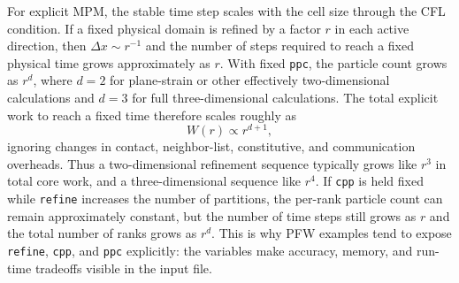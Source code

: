 For explicit MPM, the stable time step scales with the cell size through the CFL condition.  If a fixed physical domain is refined by a factor \(r\) in each active direction, then \(\Delta x\sim r^{-1}\) and the number of steps required to reach a fixed physical time grows approximately as \(r\).  With fixed \texttt{ppc}, the particle count grows as \(r^d\), where \(d=2\) for plane-strain or other effectively two-dimensional calculations and \(d=3\) for full three-dimensional calculations.  The total explicit work to reach a fixed time therefore scales roughly as
\begin{equation}
  W(r) \propto r^{d+1},
\end{equation}
ignoring changes in contact, neighbor-list, constitutive, and communication overheads.  Thus a two-dimensional refinement sequence typically grows like \(r^3\) in total core work, and a three-dimensional sequence like \(r^4\).  If \texttt{cpp} is held fixed while \texttt{refine} increases the number of partitions, the per-rank particle count can remain approximately constant, but the number of time steps still grows as \(r\) and the total number of ranks grows as \(r^d\).  This is why PFW examples tend to expose \texttt{refine}, \texttt{cpp}, and \texttt{ppc} explicitly: the variables make accuracy, memory, and run-time tradeoffs visible in the input file.
